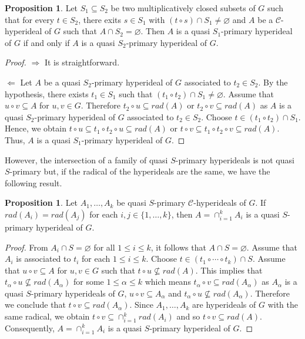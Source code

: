 \documentclass[preprint,review,10pt]{amsart}
\theoremstyle{definition}
\newtheorem{proposition}[theorem]{Proposition}
\theoremstyle{remark}
\numberwithin{equation}{section}
\begin{document}
\begin{proposition}
Let $S_1 \subseteq S_2$ be two multiplicatively closed subsets of $G$ such that for  every $t \in S_2$,  there exits $s \in S_1$ with $(t \circ s) \cap  S_1 \neq \varnothing $ and $A$ be a $\mathcal{C}$-hyperideal of $G$ such that $A \cap S_2 =\varnothing$. Then $A$ is a quasi $S_1$-primary hyperideal of $G$ if and only if $A$ is a quasi $S_2$-primary hyperideal of $G$.
\end{proposition}
\begin{proof}
$\Longrightarrow$ It is straightforward.

$\Longleftarrow $ Let $A$ be a quasi $S_2$-primary hyperideal of $G$ associated to $t_2 \in S_2$. By the hypothesis,  there exists $t_1 \in S_1$ such that $(t_1 \circ t_2) \cap S_1 \neq \varnothing$. Assume that $u \circ v \subseteq A$ for $u,v \in G$. Therefore $t_2 \circ u \subseteq rad(A)$ or $t_2 \circ v \subseteq rad(A)$ as $A$ is a quasi $S_2$-primary hyperideal of $G$ associated to $t_2 \in S_2$. Choose $t \in (t_1 \circ t_2)  \cap S_1$. Hence, we obtain $t \circ u \subseteq t_1 \circ t_2 \circ u \subseteq rad(A)$ or $t \circ v \subseteq t_1 \circ t_2 \circ v \subseteq rad(A)$. Thus, $A$ is a quasi $S_1$-primary hyperideal of $G$.
\end{proof}
However,  the intersection of a family of quasi $S$-primary hyperideals is not quasi $S$-primary  but, if the radical of the hyperideals are the same,  we have the following result.
\begin{proposition}  \label{intersec}
Let $A_1, \ldots,A_k$ be quasi $S$-primary $\mathcal{C}$-hyperideals of $G$. If $rad(A_i)=rad(A_j)$ for each $i,j \in \{1,\ldots,k\}$, then $A=\cap_{i=1}^kA_i$ is a quasi $S$-primary  hyperideal of $G$.
\end{proposition}
\begin{proof}
From  $A_i \cap S = \varnothing$ for all $1 \leq i \leq k$, it follows that $A \cap S = \varnothing$. Assume that $A_i$ is associated to $t_i$ for each $1 \leq i \leq k$. Choose $t \in (t_1 \circ \cdots \circ t_k) \cap S$. Assume that $u \circ v \subseteq A$ for $u,v \in G$ such that $t \circ u \nsubseteq rad(A)$. This implies that $t_{\alpha} \circ u \nsubseteq rad(A_{\alpha})$ for some $1 \leq \alpha \leq k$ which  means $t_{\alpha} \circ v \subseteq rad(A_{\alpha})$ as $A_{\alpha}$ is a quasi $S$-primary hyperideals of $G$, $u \circ v \subseteq A_{\alpha}$ and $t_{\alpha} \circ u \nsubseteq rad(A_{\alpha})$. Therefore we conclude that $t \circ v  \subseteq rad(A_{\alpha})$. Since $A_1, \ldots,A_k$ are hyperideals of $G$ with the same radical, we obtain $t \circ v \subseteq \cap_{i=1}^k rad(A_i)$ and so $t \circ v \subseteq rad(A)$. Consequently, $A=\cap_{i=1}^kA_i$ is a quasi $S$-primary  hyperideal of $G$.
\end{proof}
\end{document}

